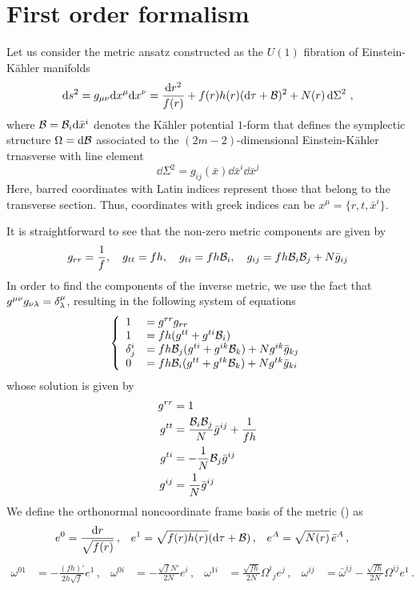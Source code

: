 \chapter{First order formalism}
Let us consider the metric ansatz constructed as the $U(1)$ fibration of Einstein-K\"ahler manifolds
\begin{equation}
   \dd{s^2}=g_{\mu\nu}\dd x^\mu \dd x^\nu = \frac{\dd{r^2}}{f(r)}+f(r)h(r)(\dd{\tau}+\mathcal{B})^2+N(r)\dd{\Sigma}^2\,,
\end{equation}
where $\mathcal{B}=\mathcal{B}_i\dd \bar{x}^{i}$ denotes the K\"ahler potential $1$-form that defines the symplectic structure $\Omega=\dd\mathcal{B} $ associated to the $(2m-2)$-dimensional Einstein-K\"ahler trnasverse with line element
\begin{equation}
  \dd\Sigma^2 = g_{ij}(\bar{x})\dd \bar{x}^{i}\dd \bar{x}^j
\end{equation}
Here, barred coordinates with Latin indices represent those that belong to the transverse section. Thus, coordinates with greek indices can be $x^\mu=\{r,t,\bar{x}^i\}$.

It is straightforward to see that the non-zero metric components are given by
\begin{align}
  g_{rr}=\frac{1}{f},\quad g_{tt}=fh,\quad g_{ti}=fh\mathcal{B}_i,\quad g_{ij}=fh\mathcal{B}_i\mathcal{B}_j+N\bar{g}_{ij}
\end{align}
In order to find the components of the inverse metric, we use the fact that $g^{\mu\nu }g_{\nu\lambda }=\delta^\mu_\lambda$, resulting in the following system of equations
\begin{equation}
\left\{
\begin{array}{lll}
  1&=g^{rr}g_{rr}\\
  1&=fh(g^{tt}+g^{ti}\mathcal{B}_i)\\
  \delta^{i}_j&=fh\mathcal{B}_j(g^{ti}+g^{ik}\mathcal{B}_k)+Ng^{ik}\bar{g}_{kj}\\
  0&=fh\mathcal{B}_i(g^{tt}+g^{tk}\mathcal{B}_k)+Ng^{tk}\bar{g}_{ki}
\end{array}
\right.
\end{equation}
whose solution is given by
\begin{align}
  g^{rr}&=1\\
  g^{tt}&=\frac{\mathcal{B}_i\mathcal{B}_j}{N}\bar{g}^{ij}+\frac{1}{fh}\\
  g^{ti}&=-\frac{1}{N}\mathcal{B}_j\bar{g}^{ij}\\
  g^{ij}&=\frac{1}{N}\bar{g}^{ij}
\end{align}
We define the orthonormal noncoordinate frame basis of the metric () as
\begin{align}
    e^0&=\frac{\dd r}{\sqrt{f(r)}}\,,& e^1&=\sqrt{f(r)h(r)}(\dd\tau+\mathcal{B})\,,& e^{A}&=\sqrt{N(r)}\,\bar{e}^{A}\,,
\end{align}
\begin{align}
    \omega^{01}&=-\frac{(fh)'}{2h\sqrt{f}}e^1\,, & 
    \omega^{0i}&=-\frac{\sqrt{f}N'}{2N}e^{i}\,, &
    \omega^{1i}&=\frac{\sqrt{fh}}{2N}\Omega^{i}{}_je^j\,, &
    \omega^{ij}&=\bar{\omega}^{ij}-\frac{\sqrt{fh}}{2N}\Omega^{ij}e^1\,.
\end{align}

